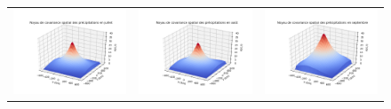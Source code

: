 \documentclass[a4paper,11pt]{article}
\numberwithin{equation}{section}
\begin{document}
\begin{figure}[H]
\hspace{-1.3cm}
\begin{tabular}{ccc}
	\includegraphics[scale=0.34]{images/kernel_precip_m7.png} & \includegraphics[scale=0.34]{images/kernel_precip_m8.png} & \includegraphics[scale=0.34]{images/kernel_precip_m9.png} \\ 

\end{tabular}
\end{figure}
\end{document}
